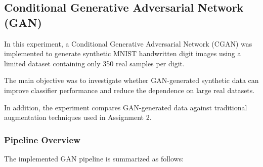 \begingroup
\graphicspath{{../prob_2/Figures/}}


\subsection{Conditional Generative Adversarial Network (GAN)}

In this experiment, a Conditional Generative Adversarial Network (CGAN) was implemented to generate synthetic MNIST handwritten digit images using a limited dataset containing only 350 real samples per digit.

The main objective was to investigate whether GAN-generated synthetic data can improve classifier performance and reduce the dependence on large real datasets.

In addition, the experiment compares GAN-generated data against traditional augmentation techniques used in Assignment 2.

\subsubsection{Pipeline Overview}

The implemented GAN pipeline is summarized as follows:

